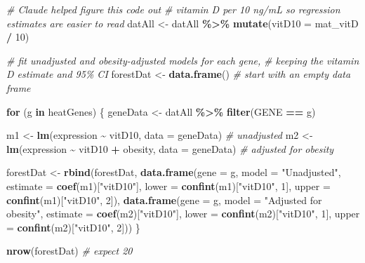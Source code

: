 \documentclass[
]{article}
\newenvironment{Shaded}{\begin{snugshade}}{\end{snugshade}}
\newcommand{\AttributeTok}[1]{\textcolor[rgb]{0.13,0.29,0.53}{#1}}
\newcommand{\CommentTok}[1]{\textcolor[rgb]{0.56,0.35,0.01}{\textit{#1}}}
\newcommand{\ControlFlowTok}[1]{\textcolor[rgb]{0.13,0.29,0.53}{\textbf{#1}}}
\newcommand{\DecValTok}[1]{\textcolor[rgb]{0.00,0.00,0.81}{#1}}
\newcommand{\FunctionTok}[1]{\textcolor[rgb]{0.13,0.29,0.53}{\textbf{#1}}}
\newcommand{\NormalTok}[1]{#1}
\newcommand{\OtherTok}[1]{\textcolor[rgb]{0.56,0.35,0.01}{#1}}
\newcommand{\SpecialCharTok}[1]{\textcolor[rgb]{0.81,0.36,0.00}{\textbf{#1}}}
\newcommand{\StringTok}[1]{\textcolor[rgb]{0.31,0.60,0.02}{#1}}
\begin{document}
\begin{Shaded}
\begin{Highlighting}[]
\CommentTok{\# Claude helped figure this code out}
\CommentTok{\# vitamin D per 10 ng/mL so regression estimates are easier to read}
\NormalTok{datAll }\OtherTok{\textless{}{-}}\NormalTok{ datAll }\SpecialCharTok{\%\textgreater{}\%} \FunctionTok{mutate}\NormalTok{(}\AttributeTok{vitD10 =}\NormalTok{ mat\_vitD }\SpecialCharTok{/} \DecValTok{10}\NormalTok{)}

\CommentTok{\# fit unadjusted and obesity{-}adjusted models for each gene,}
\CommentTok{\# keeping the vitamin D estimate and 95\% CI}
\NormalTok{forestDat }\OtherTok{\textless{}{-}} \FunctionTok{data.frame}\NormalTok{()   }\CommentTok{\# start with an empty data frame}

\ControlFlowTok{for}\NormalTok{ (g }\ControlFlowTok{in}\NormalTok{ heatGenes) \{}
\NormalTok{  geneData }\OtherTok{\textless{}{-}}\NormalTok{ datAll }\SpecialCharTok{\%\textgreater{}\%} \FunctionTok{filter}\NormalTok{(GENE }\SpecialCharTok{==}\NormalTok{ g)}

\NormalTok{  m1 }\OtherTok{\textless{}{-}} \FunctionTok{lm}\NormalTok{(expression }\SpecialCharTok{\textasciitilde{}}\NormalTok{ vitD10, }\AttributeTok{data =}\NormalTok{ geneData)           }\CommentTok{\# unadjusted}
\NormalTok{  m2 }\OtherTok{\textless{}{-}} \FunctionTok{lm}\NormalTok{(expression }\SpecialCharTok{\textasciitilde{}}\NormalTok{ vitD10 }\SpecialCharTok{+}\NormalTok{ obesity, }\AttributeTok{data =}\NormalTok{ geneData) }\CommentTok{\# adjusted for obesity}

\NormalTok{  forestDat }\OtherTok{\textless{}{-}} \FunctionTok{rbind}\NormalTok{(forestDat,}
    \FunctionTok{data.frame}\NormalTok{(}\AttributeTok{gene =}\NormalTok{ g, }\AttributeTok{model =} \StringTok{"Unadjusted"}\NormalTok{,}
               \AttributeTok{estimate =} \FunctionTok{coef}\NormalTok{(m1)[}\StringTok{"vitD10"}\NormalTok{],}
               \AttributeTok{lower =} \FunctionTok{confint}\NormalTok{(m1)[}\StringTok{"vitD10"}\NormalTok{, }\DecValTok{1}\NormalTok{],}
               \AttributeTok{upper =} \FunctionTok{confint}\NormalTok{(m1)[}\StringTok{"vitD10"}\NormalTok{, }\DecValTok{2}\NormalTok{]),}
    \FunctionTok{data.frame}\NormalTok{(}\AttributeTok{gene =}\NormalTok{ g, }\AttributeTok{model =} \StringTok{"Adjusted for obesity"}\NormalTok{,}
               \AttributeTok{estimate =} \FunctionTok{coef}\NormalTok{(m2)[}\StringTok{"vitD10"}\NormalTok{],}
               \AttributeTok{lower =} \FunctionTok{confint}\NormalTok{(m2)[}\StringTok{"vitD10"}\NormalTok{, }\DecValTok{1}\NormalTok{],}
               \AttributeTok{upper =} \FunctionTok{confint}\NormalTok{(m2)[}\StringTok{"vitD10"}\NormalTok{, }\DecValTok{2}\NormalTok{]))}
\NormalTok{\}}

\FunctionTok{nrow}\NormalTok{(forestDat)   }\CommentTok{\# expect 20}
\end{Highlighting}
\end{Shaded}
\end{document}
